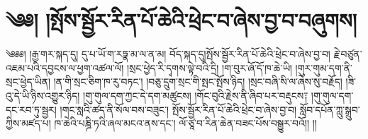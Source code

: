 \chapter{༄༅། །སྤོས་སྦྱོར་རིན་པོ་ཆེའི་ཕྲེང་བ་ཞེས་བྱ་བ་བཞུགས།}༄༅༅། །རྒྱ་གར་སྐད་དུ། དུ་པ་ཡོ་ག་རཏྣ་མ་ལ་ན་མ། བོད་སྐད་དུ།སྤོས་སྦྱོར་རིན་པོ་ཆེའི་ཕྲེང་བ་ཞེས་བྱ་བ། རྗེ་བཙུན་འཇམ་པའི་དབྱངས་ལ་ཕྱག་འཚལ་ལོ། །སྲང་ཕྱེད་རི་དྭགས་ལྟེ་བའི་དྲི། །ག་བུར་ཞོ་དོ་ཁ་ཆེ་ཡི། །གུར་གུམ་དག་ནི་སྲང་ཕྱེད་ཡིན། །ན་གི་སྲང་ཅིག་ཁ་རུ་བཏང་། །བཅུ་དྲུག་སྲང་གི་སྤང་སྤོས་ཉིད། །སྲང་བཞི་སི་ལ་ཞེས་སུ་བརྗོད། །ཟི་འུ་དེ་ཡི་ཉིས་འགྱུར་ཉིད། །གུ་གུལ་དག་ཀྱང་དེ་དག་མཚུངས། །གོང་བུའི་རྗེས་ནི་ཞིབ་པར་བརྡུངས༑ །གུ་གུལ་དག་དང་རབ་ཏུ་སྦྱར། །གང་སླའི་ཚད་ནི་སོལ་བས་བཟུང་། སྤོས་སྦྱོར་རིན་པོ་ཆེའི་ཕྲེང་བ་ཞེས་བྱ་བ། སློབ་དཔོན་ཀླུ་སྒྲུབ་ཀྱིས་མཛད་པ། ཁ་ཆེའི་པཎྜི་ཏའི་ཞལ་མངའ་ནས་དང་། ལོ་ཙཱ་བ་རིན་ཆེན་བཟང་པོས་བསྒྱུར་བའོ།། །།